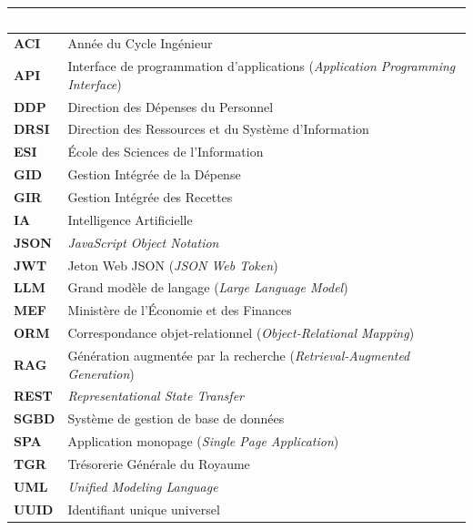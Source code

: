 \documentclass[a4paper,12pt,oneside]{report}
\newcommand{\thd}[1]{\textcolor{white}{\textbf{#1}}}
\renewcommand{\arraystretch}{1.28}
\begin{document}
\begin{center}
\renewcommand{\arraystretch}{1.22}
\begin{tabular}{>{\bfseries}l l}
\toprule
\rowcolor{gHead}\thd{Sigle} & \thd{Signification} \\
\midrule
ACI  & Année du Cycle Ingénieur \\
API  & Interface de programmation d'applications (\emph{Application Programming Interface}) \\
DDP  & Direction des Dépenses du Personnel \\
DRSI & Direction des Ressources et du Système d'Information \\
ESI  & École des Sciences de l'Information \\
GID  & Gestion Intégrée de la Dépense \\
GIR  & Gestion Intégrée des Recettes \\
IA   & Intelligence Artificielle \\
JSON & \emph{JavaScript Object Notation} \\
JWT  & Jeton Web JSON (\emph{JSON Web Token}) \\
LLM  & Grand modèle de langage (\emph{Large Language Model}) \\
MEF  & Ministère de l'Économie et des Finances \\
ORM  & Correspondance objet-relationnel (\emph{Object-Relational Mapping}) \\
RAG  & Génération augmentée par la recherche (\emph{Retrieval-Augmented Generation}) \\
REST & \emph{Representational State Transfer} \\
SGBD & Système de gestion de base de données \\
SPA  & Application monopage (\emph{Single Page Application}) \\
TGR  & Trésorerie Générale du Royaume \\
UML  & \emph{Unified Modeling Language} \\
UUID & Identifiant unique universel \\
\bottomrule
\end{tabular}
\end{center}

\listoftables
{}
\listoffigures
{}

\cleardoublepage
{}
\end{document}
